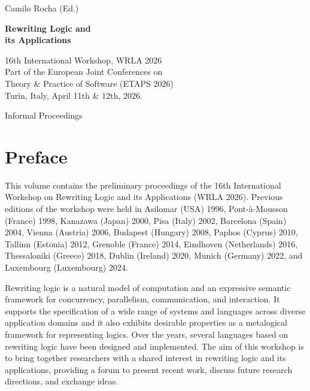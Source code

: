 \documentclass[a4paper]{llncs}
\begin{document}
\setcounter{page}{1}
\pagestyle{empty}

\noindent
{\Large Camilo Rocha (Ed.) }

\vspace{4cm}

\noindent
{\Huge\bf Rewriting Logic and\\ its Applications}

\vspace{1cm}

\noindent
{\LARGE 16th International Workshop, {\sc WRLA 2026} \\[2ex]
Part of the European Joint Conferences on\\ Theory \& Practice of Software (ETAPS 2026)
 \\[2ex]
Turin, Italy, April 11th \& 12th, 2026.}

\vspace{1cm}
\begin{center}
{\LARGE Informal Proceedings}
\end{center}

\vfill


\cleardoublepage

\pagestyle{plain}

\section*{Preface}

This volume contains the preliminary proceedings of the 16th
International Workshop on Rewriting Logic and its Applications (WRLA
2026).
%
Previous editions of the workshop were held in Asilomar (USA) 1996,
Pont-\`a-Mousson (France) 1998, Kanazawa (Japan) 2000, Pisa (Italy)
2002, Barcelona (Spain) 2004, Vienna (Austria) 2006, Budapest
(Hungary) 2008, Paphos (Cyprus) 2010, Tallinn (Estonia) 2012, Grenoble
(France) 2014, Eindhoven (Netherlands) 2016, Thessaloniki (Greece)
2018, Dublin (Ireland) 2020, Munich (Germany) 2022, and Luxembourg
(Luxembourg) 2024.

Rewriting logic is a natural model of computation and an expressive
semantic framework for concurrency, parallelism, communication, and
interaction. It supports the specification of a wide range of systems
and languages across diverse application domains and it also exhibits
desirable properties as a metalogical framework for representing
logics. Over the years, several languages based on rewriting logic
have been designed and implemented. The aim of this workshop is to
bring together researchers with a shared interest in rewriting logic
and its applications, providing a forum to present recent work,
discuss future research directions, and exchange ideas.
\end{document}
